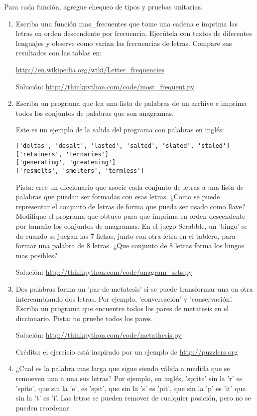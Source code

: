 Para cada función, agregue chequeo de tipos y pruebas unitarias.
\begin{enumerate}
\item Escriba una función mas\_frecuentes que tome una cadena e imprima
las letras en orden descendente por frecuencia. Ejecútela con textos
de diferentes lenguajes y observe como varían las frecuencias de letras.
Compare sus resultados con las tablas en:

\url{http://en.wikipedia.org/wiki/Letter_frequencies}

Solución: \url{http://thinkpython.com/code/most_frequent.py}
\item Escriba un programa que lea una lista de palabras de un archivo e
imprima todos los conjuntos de palabras que son anagramas.

Este es un ejemplo de la salida del programa con palabras en inglés:
\begin{verbatim}
['deltas', 'desalt', 'lasted', 'salted', 'slated', 'staled'] 
['retainers', 'ternaries'] 
['generating', 'greatening']
['resmelts', 'smelters', 'termless']
\end{verbatim}
Pista: cree un diccionario que asocie cada conjunto de letras a una
lista de palabras que puedan ser formadas con esas letras. ¿Como se
puede representar el conjunto de letras de forma que pueda ser usado
como llave? Modifique el programa que obtuvo para que imprima en orden
descendente por tamaño los conjuntos de anagramas. En el juego Scrabble,
un 'bingo' se da cuando se juegan las 7 fichas, junto con otra letra
en el tablero, para formar una palabra de 8 letras. ¿Que conjunto
de 8 letras forma los bingos mas posibles?

Solución: \url{http://thinkpython.com/code/anagram_sets.py}
\item Dos palabras forma un 'par de metatesis' si se puede transformar una
en otra intercambiando dos letras. Por ejemplo, 'conversación' y 'conservación'.
Escriba un programa que encuentre todos los pares de metatesis en
el diccionario. Pista: no pruebe todos los pares.

Solución: \url{http://thinkpython.com/code/metathesis.py}

Crédito: el ejercicio está inspirado por un ejemplo de \url{http://puzzlers.org}
\item ¿Cual es la palabra mas larga que sigue siendo válida a medida que
se remueven una a una sus letras? Por ejemplo, en inglés, 'sprite'
sin la 'r' es 'spite', que sin la 'e', es 'spit', que sin la 's' es
'pit', que sin la 'p' es 'it' que sin la 't' es 'i'. Las letras se
pueden remover de cualquier posición, pero no se pueden reordenar.


\end{enumerate}
